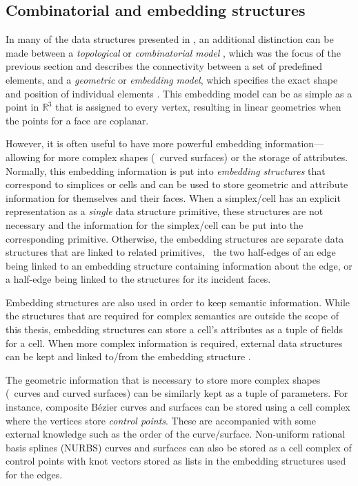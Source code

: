 \subsection{Combinatorial and embedding structures}
\label{ss:combinatorial-embedding}

In many of the data structures presented in , an additional distinction can be made between a \emph{topological} or \emph{combinatorial model} \citep{Lienhardt91}, which was the focus of the previous section and describes the connectivity between a set of predefined elements, and a \emph{geometric} or \emph{embedding model}, which specifies the exact shape and position of individual elements \citep{Mantyla88}.
This embedding model can be as simple as a point in $\mathbb{R}^3$ that is assigned to every vertex, resulting in linear geometries when the points for a face are coplanar.

However, it is often useful to have more powerful embedding information---allowing for more complex shapes (\eg\ curved surfaces) or the storage of attributes.
Normally, this embedding information is put into \emph{embedding structures} that correspond to simplices or cells and can be used to store geometric and attribute information for themselves and their faces.
When a simplex/cell has an explicit representation as a \emph{single} data structure primitive, these structures are not necessary and the information for the simplex/cell can be put into the corresponding primitive.
Otherwise, the embedding structures are separate data structures that are linked to related primitives, \eg\ the two half-edges of an edge being linked to an embedding structure containing information about the edge, or a half-edge being linked to the structures for its incident faces.

Embedding structures are also used in order to keep semantic information.
While the structures that are required for complex semantics are outside the scope of this thesis, embedding structures can store a cell's attributes as a tuple of fields for a cell.
When more complex information is required, external data structures can be kept and linked to/from the embedding structure \citep{Kuhn05}.

The geometric information that is necessary to store more complex shapes (\eg\ curves and curved surfaces) can be similarly kept as a tuple of parameters.
For instance, composite B\'ezier curves and surfaces \citep{Bezier77} can be stored using a cell complex where the vertices store \emph{control points}.
These are accompanied with some external knowledge such as the order of the curve/surface.
Non-uniform rational basis splines (NURBS) curves and surfaces \citep{Versprille75} can also be stored as a cell complex of control points with knot vectors stored as lists in the embedding structures used for the edges.

